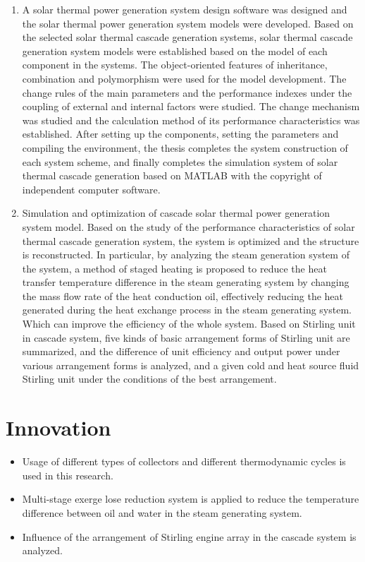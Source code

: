 \begin{enumerate}[label=(\arabic*)]
  \item A solar thermal power generation system design software was designed and the solar thermal power generation system models were developed. Based on the selected solar thermal cascade generation systems, solar thermal cascade generation system models were established based on the model of each component in the systems. The object-oriented features of inheritance, combination and polymorphism were used for the model development. The change rules of the main parameters and the performance indexes under the coupling of external and internal factors were studied. The change mechanism was studied and the calculation method of its performance characteristics was established. After setting up the components, setting the parameters and compiling the environment, the thesis completes the system construction of each system scheme, and finally completes the simulation system of solar thermal cascade generation based on MATLAB with the copyright of independent computer software. 
  \item Simulation and optimization of cascade solar thermal power generation system model. Based on the study of the performance characteristics of solar thermal cascade generation system, the system is optimized and the structure is reconstructed. In particular, by analyzing the steam generation system of the system, a method of staged heating is proposed to reduce the heat transfer temperature difference in the steam generating system by changing the mass flow rate of the heat conduction oil, effectively reducing the heat generated during the heat exchange process in the steam generating system. Which can improve the efficiency of the whole system. Based on Stirling unit in cascade system, five kinds of basic arrangement forms of Stirling unit are summarized, and the difference of unit efficiency and output power under various arrangement forms is analyzed, and a given cold and heat source fluid Stirling unit under the conditions of the best arrangement.
\end{enumerate}

\section{Innovation}
%
%

\begin{itemize}
  \item Usage of different types of collectors and different thermodynamic cycles is used in this research.
  \item Multi-stage exerge lose reduction system is applied to reduce the temperature difference between oil and water in the steam generating system.
  \item Influence of the arrangement of Stirling engine array in the cascade system is analyzed.
\end{itemize}

